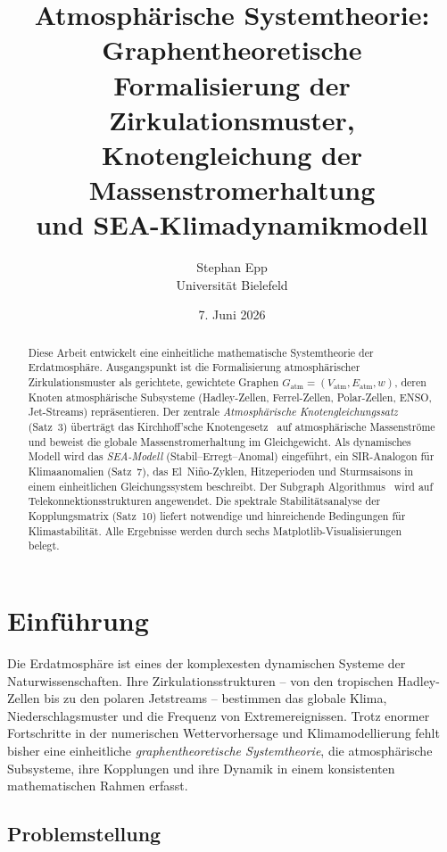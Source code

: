 ﻿\documentclass[a4paper,12pt]{article}
\title{Atmosph\"arische Systemtheorie:\\
Graphentheoretische Formalisierung der Zirkulationsmuster,\\
Knotengleichung der Massenstromerhaltung\\
und SEA-Klimadynamikmodell}
\author{Stephan Epp\\
\small Universit\"at Bielefeld}
\date{7. Juni 2026}
\theoremstyle{definition}
\begin{document}
\maketitle

\begin{abstract}
Diese Arbeit entwickelt eine einheitliche mathematische Systemtheorie der Erdatmosph\"are.
Ausgangspunkt ist die Formalisierung atmosph\"arischer Zirkulationsmuster als gerichtete,
gewichtete Graphen $G_{\mathrm{atm}} = (V_{\mathrm{atm}}, E_{\mathrm{atm}}, w)$,
deren Knoten atmosph\"arische Subsysteme (Hadley-Zellen, Ferrel-Zellen, Polar-Zellen,
ENSO, Jet-Streams) repr\"asentieren. Der zentrale \emph{Atmosph\"arische Knotengleichungssatz}
(Satz~3) \"ubertr\"agt das Kirchhoff'sche Knotengesetz~\cite{epp2026knoten} auf
atmosph\"arische Massenstr\"ome und beweist die globale Massenstromerhaltung im Gleichgewicht.
Als dynamisches Modell wird das \emph{SEA-Modell} (Stabil--Erregt--Anomal) eingef\"uhrt,
ein SIR-Analogon f\"ur Klimaanomalien (Satz~7), das El~Ni\~no-Zyklen, Hitzeperioden
und Sturmsaisons in einem einheitlichen Gleichungssystem beschreibt. Der
Subgraph Algorithmus~\cite{epp2026subgraph} wird auf Telekonnektionsstrukturen
angewendet. Die spektrale Stabili\-t\"atsanalyse der Kopplungsmatrix
(Satz~10) liefert notwendige und hinreichende Bedingungen f\"ur Klimastabilit\"at.
Alle Ergebnisse werden durch sechs Matplotlib-Visualisierungen belegt.
\end{abstract}

\tableofcontents
\newpage

\section{Einf\"uhrung}

Die Erdatmosph\"are ist eines der komplexesten dynamischen Systeme der Naturwissenschaften.
Ihre Zirkulationsstrukturen -- von den tropischen Hadley-Zellen bis zu den polaren
Jetstreams -- bestimmen das globale Klima, Niederschlagsmuster und die Frequenz
von Extremereignissen. Trotz enormer Fortschritte in der numerischen Wettervorhersage
und Klimamodellierung fehlt bisher eine einheitliche \emph{graphentheoretische Systemtheorie},
die atmosph\"arische Subsysteme, ihre Kopplungen und ihre Dynamik in einem konsistenten
mathematischen Rahmen erfasst.

\subsection{Problemstellung}
\end{document}
